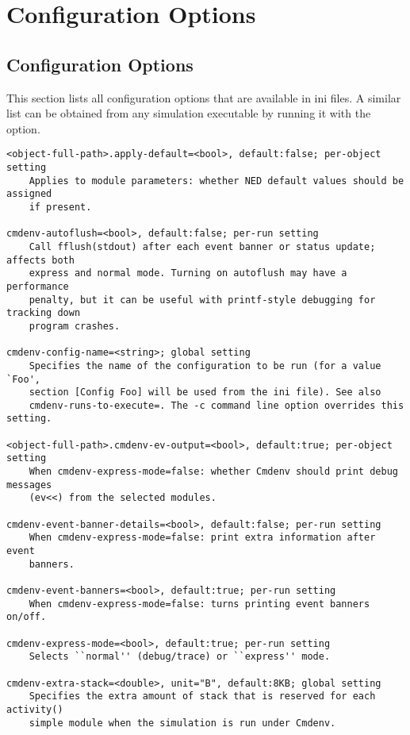 \chapter{Configuration Options}
\label{cha:config-options}

\section{Configuration Options}

This section lists all configuration options that are available in ini files.
A similar list can be obtained from any simulation executable by running it
with the  option.

\begin{verbatim}
<object-full-path>.apply-default=<bool>, default:false; per-object setting
    Applies to module parameters: whether NED default values should be assigned
    if present.

cmdenv-autoflush=<bool>, default:false; per-run setting
    Call fflush(stdout) after each event banner or status update; affects both
    express and normal mode. Turning on autoflush may have a performance
    penalty, but it can be useful with printf-style debugging for tracking down
    program crashes.

cmdenv-config-name=<string>; global setting
    Specifies the name of the configuration to be run (for a value `Foo',
    section [Config Foo] will be used from the ini file). See also
    cmdenv-runs-to-execute=. The -c command line option overrides this setting.

<object-full-path>.cmdenv-ev-output=<bool>, default:true; per-object setting
    When cmdenv-express-mode=false: whether Cmdenv should print debug messages
    (ev<<) from the selected modules.

cmdenv-event-banner-details=<bool>, default:false; per-run setting
    When cmdenv-express-mode=false: print extra information after event
    banners.

cmdenv-event-banners=<bool>, default:true; per-run setting
    When cmdenv-express-mode=false: turns printing event banners on/off.

cmdenv-express-mode=<bool>, default:true; per-run setting
    Selects ``normal'' (debug/trace) or ``express'' mode.

cmdenv-extra-stack=<double>, unit="B", default:8KB; global setting
    Specifies the extra amount of stack that is reserved for each activity()
    simple module when the simulation is run under Cmdenv.


\end{verbatim}
